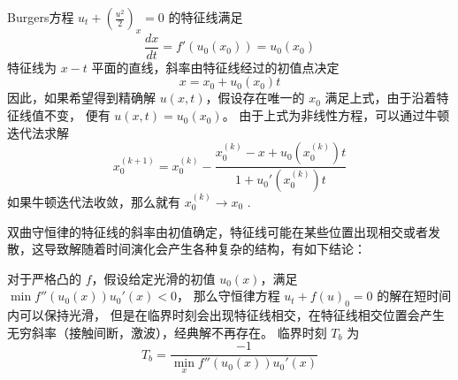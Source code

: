 \begin{example}
    Burgers方程 $u_t + \left(\frac{u^2}2\right)_x = 0$ 的特征线满足
    \[
        \frac{d x}{d t} = f'(u_0(x_0)) = u_0(x_0)
    \]
    特征线为 $x\!-\!t$ 平面的直线，斜率由特征线经过的初值点决定
    \[
        x = x_0 + u_0(x_0) t
    \]
    因此，如果希望得到精确解 $u(x,t)$，假设存在唯一的 $x_0$ 满足上式，由于沿着特征线值不变，
    便有 $u(x,t) = u_0(x_0)$。
    由于上式为非线性方程，可以通过牛顿迭代法求解
    \[
        x_0^{(k+1)} = x_0^{(k)} - \frac{x_0^{(k)}-x+u_0(x_0^{(k)})t}{1 + u_0'(x_0^{(k)})t}
    \]
    如果牛顿迭代法收敛，那么就有 $x_0^{(k)} \to x_0$ .
\end{example}

双曲守恒律的特征线的斜率由初值确定，特征线可能在某些位置出现相交或者发散，这导致解随着时间演化会产生各种复杂的结构，有如下结论：

\begin{theorem}
    对于严格凸的 $f$，假设给定光滑的初值 $u_0(x)$，满足 $\min f''(u_0(x)) u_0'(x) < 0$，
    那么守恒律方程 $u_t + f(u)_0 = 0$ 的解在短时间内可以保持光滑，
    但是在临界时刻会出现特征线相交，在特征线相交位置会产生无穷斜率（接触间断，激波），经典解不再存在。
    临界时刻 $T_b$ 为
    \[
        T_b = \frac{-1}{\min_x f''(u_0(x)) u_0'(x)}
    \]
\end{theorem}

